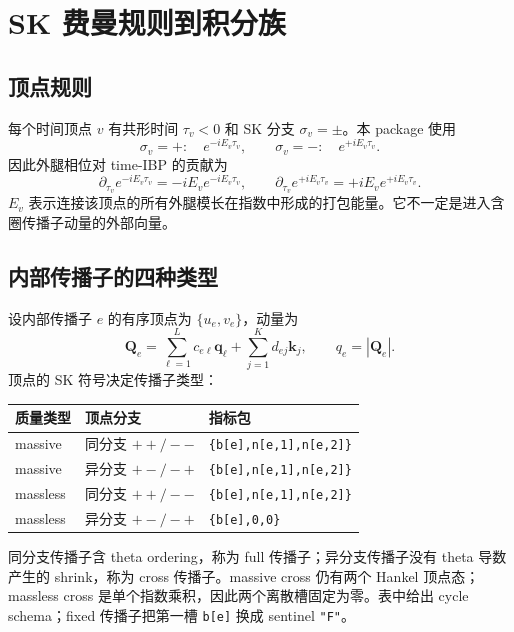 ﻿\documentclass[a4paper,11pt]{article}
\begin{document}
\section{SK 费曼规则到积分族}

\subsection{顶点规则}

每个时间顶点 $v$ 有共形时间 $\tau_v<0$ 和 SK 分支 $\sigma_v=\pm$。本 package 使用
\begin{equation}
  \sigma_v=+:\quad e^{-iE_v\tau_v},
  \qquad
  \sigma_v=-:\quad e^{+iE_v\tau_v}.
\end{equation}
因此外腿相位对 time-IBP 的贡献为
\begin{equation}
  \partial_{\tau_v}e^{-iE_v\tau_v}=-iE_v e^{-iE_v\tau_v},
  \qquad
  \partial_{\tau_v}e^{+iE_v\tau_v}=+iE_v e^{+iE_v\tau_v}.
  \label{vertexPhaseRule}
\end{equation}
$E_v$ 表示连接该顶点的所有外腿模长在指数中形成的打包能量。它不一定是进入含圈传播子动量的外部向量。

\subsection{内部传播子的四种类型}

设内部传播子 $e$ 的有序顶点为 $\{u_e,v_e\}$，动量为
\begin{equation}
 \bm Q_e=\sum_{\ell=1}^{L}c_{e\ell}\bm q_\ell
        +\sum_{j=1}^{K}d_{ej}\bm k_j,
 \qquad q_e=|\bm Q_e|.
\end{equation}
顶点的 SK 符号决定传播子类型：
\begin{center}
\begin{tabular}{lll}
\toprule
质量类型 & 顶点分支 & 指标包\\
\midrule
massive & 同分支 $++/--$ & \texttt{\{b[e],n[e,1],n[e,2]\}}\\
massive & 异分支 $+-/-+$ & \texttt{\{b[e],n[e,1],n[e,2]\}}\\
massless & 同分支 $++/--$ & \texttt{\{b[e],n[e,1],n[e,2]\}}\\
massless & 异分支 $+-/-+$ & \texttt{\{b[e],0,0\}}\\
\bottomrule
\end{tabular}
\end{center}
同分支传播子含 theta ordering，称为 full 传播子；异分支传播子没有 theta 导数产生的 shrink，称为 cross 传播子。massive cross 仍有两个 Hankel 顶点态；massless cross 是单个指数乘积，因此两个离散槽固定为零。表中给出 cycle schema；fixed 传播子把第一槽 \texttt{b[e]} 换成 sentinel \texttt{"F"}。
\end{document}
